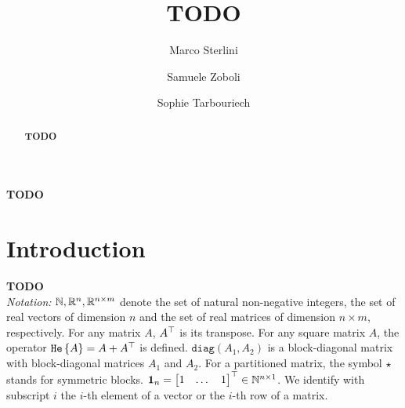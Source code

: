 \documentclass{ifacconf}
\theoremstyle{plain}
\begin{document}
\begin{frontmatter}

\title{{\color{red}\textbf{TODO}}}

\author[First]{Marco Sterlini}
\author[Second]{Samuele Zoboli}
\author[Second]{Sophie Tarbouriech}

\address[First]{\color{red}\textbf{TODO}}
\address[Second]{\color{red}\textbf{TODO}}


\begin{abstract}
{\color{red}\textbf{TODO}}
\end{abstract}

\begin{keyword}
{\color{red}\textbf{TODO}}
\end{keyword}

\end{frontmatter}

\section{Introduction}
{\color{red}\textbf{TODO}}\\
\emph{Notation:} ${\mathbb{N}}, {\mathbb{R}}^{n}, {\mathbb{R}}^{n \times m}$ denote the set of natural non-negative integers, the set of real vectors of dimension $n$ and the set of real matrices of dimension $n \times m$, respectively. For any matrix $A$, $A^\top$ is its transpose. For any square matrix $A$, the operator $\texttt{\relax{He}}\left\{{ A }\right\} = A + A^\top$ is defined. $\texttt{diag}(A_1, A_2)$ is a block-diagonal matrix with block-diagonal matrices $A_1$ and $A_2$. For a partitioned matrix, the symbol $\star$ stands for symmetric blocks. $\operatorname{\mathbf{1}}_n = \left[\begin{matrix}1 & \dots & 1\end{matrix}\right]^\top \in {\mathbb{N}}^{n \times 1}$. We identify with subscript $i$ the $i$-th element of a vector or the $i$-th row of a matrix.
\end{document}
